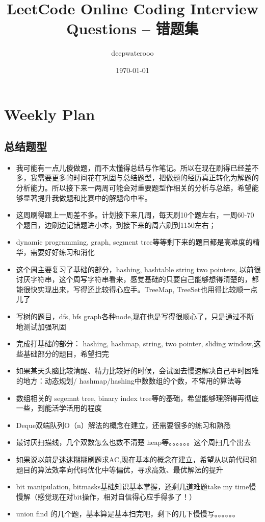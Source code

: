\documentclass[9pt, b5paaper]{book}
\author{deepwaterooo}
\date{\today}
\title{LeetCode Online Coding Interview Questions -- 错题集}
\begin{document}
\maketitle
\tableofcontents


\chapter{Weekly Plan}
\label{sec-1}
\section{总结题型}
\label{sec-1-1}
\begin{itemize}
\item 我可能有一点儿傻做题，而不太懂得总结与作笔记。所以在现在刷得已经差不多，我需要更多的时间花在巩固与总结题型，把做题的经历真正转化为解题的分析能力。所以接下来一两周可能会对重要题型作相关的分析与总结，希望能够显著提升我做题和比赛中的解题命中率。

\item 这周刷得跟上一周差不多。计划接下来几周，每天刷10个题左右，一周60-70个题目，边刷边记错题进小本，到接下来的周六刷到1150左右；
\item dynamic programming, graph, segment tree等等剩下来的题目都是高难度的精华，需要好好练习和消化

\item 这个周主要复习了基础的部分，hashing, hashtable string two pointers, 以前很讨厌字符串，这个周写字符串看来，感觉基础的只要自己能够想得清楚的，都能很快实现出来，写得还比较得心应手。TreeMap, TreeSet也用得比较顺一点儿了
\item 写树的题目，dfs, bfs graph各种node,现在也是写得很顺心了，只是通过不断地测试加强巩固

\item 完成打基础的部分： hashing, hashmap, string, two pointer, sliding window,这些基础部分的题目，希望扫完
\item 如果某天头脑比较清醒、精力比较好的时候，会试图去慢速解决自己平时困难的地方：动态规划/ hashmap/hashing中数数组的个数，不常用的算法等

\item 数组相关的 segemnt tree, binary index tree等的基础，希望能够理解得再彻底一些，到能活学活用的程度
\item Deque双端队列O（n）解法的概念在建立，还需要很多的练习和熟悉
\item 最讨厌扫描线，几个双数怎么也数不清楚 heap等。。。。。。这个周扫几个出去

\item 如果说以前是迷迷糊糊刷题求AC,现在基本的概念在建立，希望从以前代码和题目的算法效率向代码优化中等偏优，寻求高效、最优解法的提升
\item bit manipulation, bitmasks基础知识基本掌握，还剩几道难题take my time慢慢解（感觉现在对bit操作，相对自信得心应手得多了！）
\item union find 的几个题，基本算是基本扫完吧，剩下的几下慢慢写。。。。。。


\end{itemize}
\end{document}
